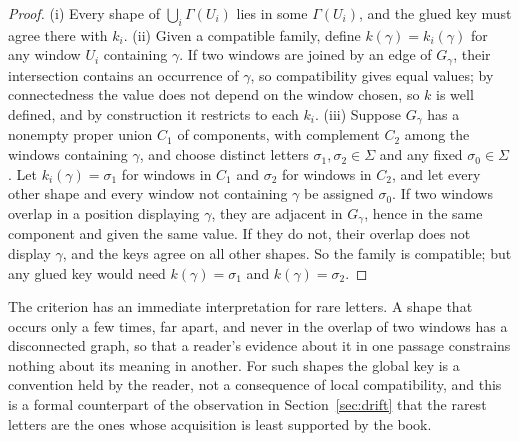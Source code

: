 \begin{proof}
(i) Every shape of $\bigcup_i\Gamma(U_i)$ lies in some $\Gamma(U_i)$, and the glued key must agree there with $k_i$. (ii) Given a compatible family, define $k(\gamma)=k_i(\gamma)$ for any window $U_i$ containing $\gamma$. If two windows are joined by an edge of $G_\gamma$, their intersection contains an occurrence of $\gamma$, so compatibility gives equal values; by connectedness the value does not depend on the window chosen, so $k$ is well defined, and by construction it restricts to each $k_i$. (iii) Suppose $G_\gamma$ has a nonempty proper union $C_1$ of components, with complement $C_2$ among the windows containing $\gamma$, and choose distinct letters $\sigma_1,\sigma_2\in\Sigma$ and any fixed $\sigma_0\in\Sigma$. Let $k_i(\gamma)=\sigma_1$ for windows in $C_1$ and $\sigma_2$ for windows in $C_2$, and let every other shape and every window not containing $\gamma$ be assigned $\sigma_0$. If two windows overlap in a position displaying $\gamma$, they are adjacent in $G_\gamma$, hence in the same component and given the same value. If they do not, their overlap does not display $\gamma$, and the keys agree on all other shapes. So the family is compatible; but any glued key would need $k(\gamma)=\sigma_1$ and $k(\gamma)=\sigma_2$.
\end{proof}

The criterion has an immediate interpretation for rare letters. A shape that occurs only a few times, far apart, and never in the overlap of two windows has a disconnected graph, so that a reader's evidence about it in one passage constrains nothing about its meaning in another. For such shapes the global key is a convention held by the reader, not a consequence of local compatibility, and this is a formal counterpart of the observation in Section~\ref{sec:drift} that the rarest letters are the ones whose acquisition is least supported by the book.

